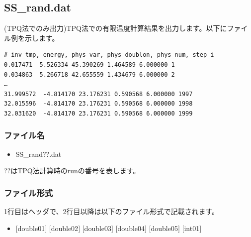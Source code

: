 \newpage
\subsection{SS\_rand.dat}
\label{Subsec:ssrand}
(TPQ法でのみ出力)TPQ法での有限温度計算結果を出力します。以下にファイル例を示します。\\
\begin{minipage}{15cm}
\begin{screen}
\begin{verbatim}
# inv_tmp, energy, phys_var, phys_doublon, phys_num, step_i
0.017471  5.526334 45.390269 1.464589 6.000000 1
0.034863  5.266718 42.655559 1.434679 6.000000 2
…
31.999572  -4.814170 23.176231 0.590568 6.000000 1997
32.015596  -4.814170 23.176231 0.590568 6.000000 1998
32.031620  -4.814170 23.176231 0.590568 6.000000 1999
\end{verbatim}
\end{screen}
\end{minipage}

\subsubsection{ファイル名}
 \begin{itemize}
   \item SS\_rand??.dat
  \end{itemize}
  ??はTPQ法計算時のrunの番号を表します。

\subsubsection{ファイル形式}
1行目はヘッダで、2行目以降は以下のファイル形式で記載されます。
 \begin{itemize}
   \item $[$double01$]$ $[$double02$]$ $[$double03$]$ $[$double04$]$ $[$double05$]$ $[$int01$]$
  \end{itemize}
